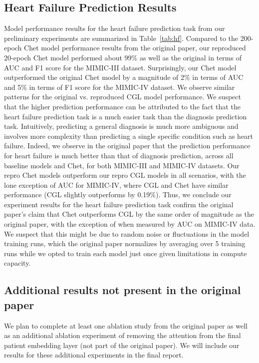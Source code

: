 \documentclass[11pt,a4paper,fleqn]{article}
\begin{document}
\subsection{Heart Failure Prediction Results}
Model performance results for the heart failure prediction task from our
preliminary experiments are summarized in Table~\ref{tab:hf}. Compared to the
200-epoch Chet model performance results from the original paper, our reproduced
20-epoch Chet model performed about 99\% as well as the original in terms of AUC
and F1 score for the MIMIC-III dataset. Surprisingly, our Chet model
outperformed the original Chet model by a magnitude of 2\% in terms of AUC and
5\% in terms of F1 score for the MIMIC-IV dataset. We observe similar patterns
for the original vs. reproduced CGL model performance. We suspect that the
higher prediction performance can be attributed to the fact that the heart
failure prediction task is a much easier task than the diagnosis prediction
task. Intuitively, predicting a general diagnosis is much more ambiguous and
involves more complexity than predicting a single specific condition such as
heart failure. Indeed, we observe in the original paper that the prediction
performance for heart failure is much better than that of diagnosis prediction,
across all baseline models and Chet, for both MIMIC-III and MIMIC-IV datasets.
Our repro Chet models outperform our repro CGL models in all scenarios, with the
lone exception of AUC for MIMIC-IV, where CGL and Chet have similar performance
(CGL slightly outperforms by 0.19\%). Thus, we conclude our experiment results
for the heart failure prediction task confirm the original paper's claim that
Chet outperforms CGL by the same order of magnitude as the original paper, with
the exception of when measured by AUC on MIMIC-IV data. We suspect that this
might be due to random noise or fluctuations in the model training runs, which
the original paper normalizes by averaging over 5 training runs while we opted to 
train each model just once given limitations in compute capacity.

\subsection{Additional results not present in the original paper}
We plan to complete at least one ablation study from the original paper as well
as an additional ablation experiment of removing the attention from the final
patient embedding layer (not part of the original paper). We will include our
results for these additional experiments in the final report.
\end{document}
